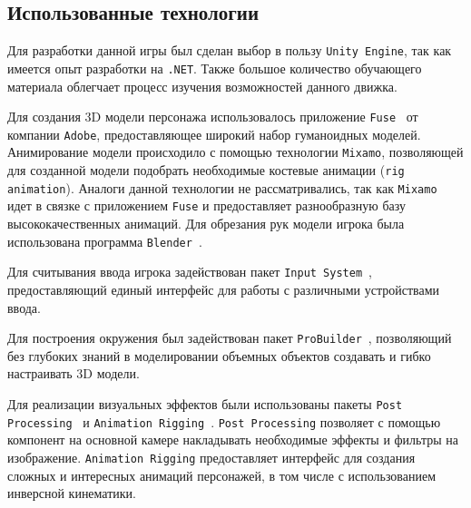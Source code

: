 \subsection{Использованные технологии}

Для разработки данной игры был сделан выбор в пользу \texttt{Unity Engine}, так как имеется опыт разработки на \texttt{.NET}. Также большое количество обучающего материала облегчает процесс изучения возможностей данного движка.

Для создания 3D модели персонажа использовалось приложение \texttt{Fuse}~\cite{Fuse} от компании \texttt{Adobe}, предоставляющее широкий набор гуманоидных моделей. Анимирование модели происходило с помощью технологии \texttt{Mixamo}, позволяющей для созданной модели подобрать необходимые костевые анимации (\texttt{rig animation}). Аналоги данной технологии не рассматривались, так как \texttt{Mixamo} идет в связке с приложением \texttt{Fuse} и предоставляет разнообразную базу высококачественных анимаций. Для обрезания рук модели игрока была использована программа \texttt{Blender}~\cite{Blender}.

Для считывания ввода игрока задействован пакет \texttt{Input System}~\cite{InputSystem}, предоставляющий единый интерфейс для работы с различными устройствами ввода.

Для построения окружения был задействован пакет \texttt{ProBuilder}~\cite{ProBuilder}, позволяющий без глубоких знаний в моделировании объемных объектов создавать и гибко настраивать 3D модели.

Для реализации визуальных эффектов были использованы пакеты \texttt{Post Processing}~\cite{PostProcessing} и \texttt{Animation Rigging}~\cite{AnimationRigging}. \texttt{Post Processing} позволяет с помощью компонент на основной камере накладывать необходимые эффекты и фильтры на изображение. \texttt{Animation Rigging} предоставляет интерфейс для создания сложных и интересных анимаций персонажей, в том числе с использованием инверсной кинематики.




